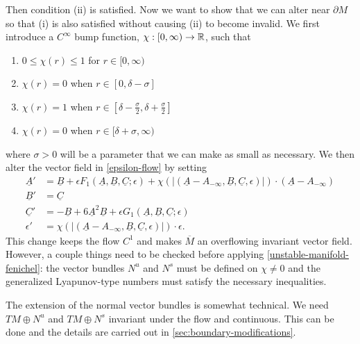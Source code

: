 Then condition (ii) is satisfied. Now we want to show that we can alter near \(\partial M\) so that (i) is also satisfied without causing (ii) to become invalid. We first introduce a \(C^\infty\) bump function, \(\chi:[0, \infty) \to \mathbb{R}\), such that 
\begin{enumerate}[label = (\arabic*)]
	\item \(0\leq \chi(r) \leq 1\) for \(r \in[0,\infty)\)
	\item \(\chi(r) = 0\) when \(r\in [0, \delta -\sigma]\)
	\item \(\chi(r) = 1\) when \(r\in [\delta - \frac \sigma 2 , \delta + \frac \sigma 2]\)
	\item \(\chi(r) = 0\) when \(r\in [\delta +\sigma,\infty)\)
\end{enumerate}
where \(\sigma > 0\) will be a parameter that we can make as small as necessary. We then alter the vector field in \cref{epsilon-flow} by setting
\begin{equation}\label{perturbed-vector-field}
\begin{aligned}
	\underline A ' &= \underline B + \epsilon F_1(\underline A, \underline B, \underline C;\epsilon) + \chi( |(\underline A - A_{-\infty}, \underline B, \underline C, \epsilon)|) \cdot (\underline A - A_{-\infty}) \\
	\underline B' &= \underline C \\
	\underline C ' &= - \underline B + 6 \underline A^2 \underline B + \epsilon G_1(\underline A, \underline B, \underline C;\epsilon) \\
	\epsilon' &= \chi( |(\underline A - A_{-\infty}, \underline B, \underline C, \epsilon)|) \cdot \epsilon.
\end{aligned}
\end{equation}
This change keeps the flow \(C^1\) and makes \(\overline M\) an overflowing invariant vector field. However, a couple things need to be checked before applying \cref{unstable-manifold-fenichel}: the vector bundles \(N^u\) and \(N^s\) must be defined on \(\chi \neq 0\) and the generalized Lyapunov-type numbers must satisfy the necessary inequalities.

The extension of the normal vector bundles is somewhat technical. We need \(T M \oplus N^u\) and \(TM \oplus N^s\) invariant under the flow and continuous. This can be done and the details are carried out in \cref{sec:boundary-modifications}.

